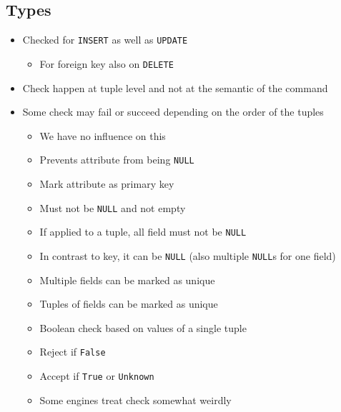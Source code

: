 \subsection{Types}
\begin{itemize}
    \item Checked for \verb+INSERT+ as well as \verb+UPDATE+
        \begin{itemize}
            \item For foreign key also on \verb+DELETE+
        \end{itemize}
    \item Check happen at tuple level and not at the semantic of the command
    \item Some check may fail or succeed depending on the order of the tuples
        \begin{itemize}
            \item We have no influence on this
        \end{itemize}
        \begin{itemize}
            \item Prevents attribute from being \verb+NULL+
        \end{itemize}
        \begin{itemize}
            \item Mark attribute as primary key
            \item Must not be \verb+NULL+ and not empty
            \item If applied to a tuple, all field must not be \verb+NULL+
        \end{itemize}
        \begin{itemize}
            \item In contrast to key, it can be \verb+NULL+ (also multiple \verb+NULL+s for one field)
            \item Multiple fields can be marked as unique
            \item Tuples of fields can be marked as unique
        \end{itemize}
        \begin{itemize}
            \item Boolean check based on values of a single tuple
            \item Reject if \verb+False+
            \item Accept if \verb+True+ or \verb+Unknown+
            \item Some engines treat check somewhat weirdly

\end{itemize}
\end{itemize}

